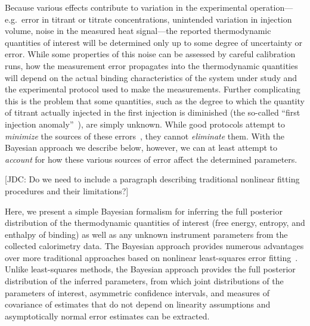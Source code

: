 \documentclass[aps,pre,twocolumn,nofootinbib,superscriptaddress,linenumbers]{revtex4-1}
\begin{document}
Because various effects contribute to variation in the experimental operation---e.g.~error in titrant or titrate concentrations, unintended variation in injection volume, noise in the measured heat signal---the reported thermodynamic quantities of interest will be determined only up to some degree of uncertainty or error.
While some properties of this noise can be assessed by careful calibration runs, how the measurement error propagates into the thermodynamic quantities will depend on the actual binding characteristics of the system under study and the experimental protocol used to make the measurements.
Further complicating this is the problem that some quantities, such as the degree to which the quantity of titrant actually injected in the first injection is diminished (the so-called ``first injection anomaly''~\cite{tellinghuisen:anal-biochem:2003:statistical-errors-in-itc,tellinghuisen:anal-biochem:2004:first-injection-anomaly}), are simply unknown.
While good protocols attempt to \emph{minimize} the sources of these errors~\cite{tellinghuisen:anal-biochem:2004:volume-errors-in-itc,tellinghuisen:anal-biochem:2004:first-injection-anomaly,tellinghuisen:jpcb:2005:optimizing-experimental-parameters-itc,tellinghuisen:jpcb:2007:variable-volume-procedures}, they cannot \emph{eliminate} them.
With the Bayesian approach we describe below, however, we can at least attempt to \emph{account} for how these various sources of error affect the determined parameters.

{\color{red} [JDC: Do we need to include a paragraph describing traditional nonlinear fitting procedures and their limitations?]}

Here, we present a simple Bayesian formalism for inferring the full posterior distribution of the thermodynamic quantities of interest (free energy, entropy, and enthalpy of binding) as well as any unknown instrument parameters from the collected calorimetry data.
The Bayesian approach provides numerous advantages over more traditional approaches based on nonlinear least-squares error fitting~\cite{wiseman:anal-biochem:1989:itc,parody-morreale:meas-sci-technol:1994:itc-assembly-and-response,parody-morreale:meas-sci-technol:1994:itc-operational-characterization}.
Unlike least-squares methods, the Bayesian approach provides the full posterior distribution of the inferred parameters, from which joint distributions of the parameters of interest, asymmetric confidence intervals, and measures of covariance of estimates that do not depend on linearity assumptions and asymptotically normal error estimates can be extracted.
\end{document}
